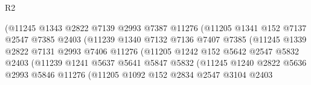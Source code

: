 \begin{lexlean}{R2}
\begin{coremodule}
                                  (@11245
                                    @1343
                                    @2822
                                    @7139
                                    @2993
                                    @7387
                                    @11276
                                    (@11205
                                      @1341
                                      @152
                                      @7137
                                      @2547
                                      @7385
                                      @2403
                                      (@11239
                                        @1340
                                        @7132
                                        @7136
                                        @7407
                                        @7385
                                        (@11245
                                          @1339
                                          @2822
                                          @7131
                                          @2993
                                          @7406
                                          @11276
                                          (@11205
                                            @1242
                                            @152
                                            @5642
                                            @2547
                                            @5832
                                            @2403
                                            (@11239
                                              @1241
                                              @5637
                                              @5641
                                              @5847
                                              @5832
                                              (@11245
                                                @1240
                                                @2822
                                                @5636
                                                @2993
                                                @5846
                                                @11276
                                                (@11205
                                                  @1092
                                                  @152
                                                  @2834
                                                  @2547
                                                  @3104
                                                  @2403

\end{coremodule}
\end{lexlean}
